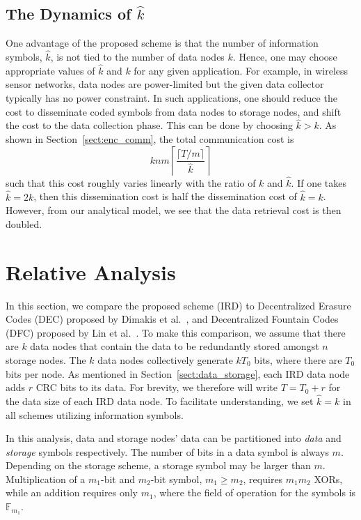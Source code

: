 \documentclass[10pt,journal,letterpaper,compsoc]{IEEEtran}
\newcommand{\0}{{\bf 0}}
\begin{document}
\subsection{The Dynamics of $\hat{k}$}
\label{sect:dynamic}
One advantage of the proposed scheme is that the number of information symbols, $\hat{k}$,
is not tied to the number of data nodes $k$.
Hence, one may choose appropriate values of $\hat{k}$ and $k$ for any given application. 
For example, in wireless sensor networks, data nodes
are power-limited but the given data collector typically has no power constraint.
In such applications, one should reduce the 
cost to disseminate coded symbols from data nodes to storage nodes,
and shift the cost to the data collection phase. This can be done 
by choosing $\hat{k} > k$. As shown in Section~\ref{sect:enc_comm}, the total 
communication cost is
$$knm\left\lceil\frac{\lceil T/m\rceil}{\hat{k}}\right\rceil$$ such that this cost roughly varies 
linearly with the ratio of $k$ and $\hat{k}$. If one takes $\hat{k}=2k$, then 
this dissemination cost is half the dissemination cost of $\hat{k}=k$. However, from our 
analytical model, we see that the data retrieval cost is then doubled. 
\section{Relative Analysis}
\label{sect:era_comp}
In this section, we compare the proposed scheme (IRD) to Decentralized Erasure Codes
(DEC) proposed by Dimakis et al.~\cite{DIM06}, and Decentralized Fountain Codes (DFC) proposed by Lin et al.~\cite{lin2007dpl}. To make this comparison, we assume
that there are $k$ data nodes that contain
the data to be redundantly stored amongst $n$ storage nodes.  The $k$ data
 nodes collectively generate $kT_0$ bits, where there are $T_0$ bits per node. As mentioned in Section~\ref{sect:data_storage}, each IRD data node adds $r$ CRC bits to its data. For brevity, we therefore will write $T = T_0 + r$ for the data size of each IRD data node. To facilitate understanding,
we set $\hat{k}=k$ in all schemes utilizing information symbols.


In this analysis, data  and storage nodes' data can be partitioned into \emph{data} and \emph{storage} symbols respectively. The number of bits in a data symbol is always $m$. Depending on the storage scheme, a storage symbol may be larger than $m$. Multiplication of a $m_1$-bit and $m_2$-bit symbol, $m_1\ge m_2$, requires $m_1m_2$ XORs, while an addition requires only $m_1$, where the field of operation for the symbols is $\mathbb{F}_{m_1}$. 
\end{document}
